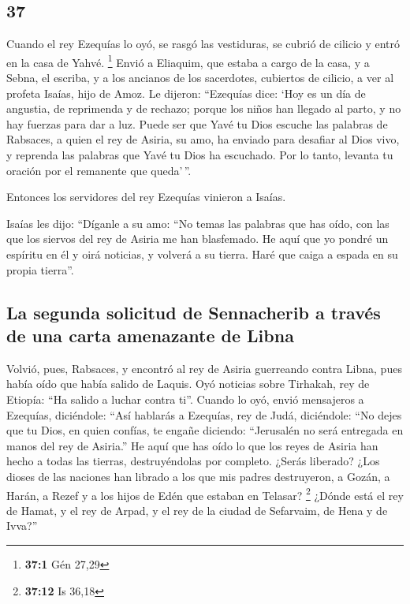 \begin{paracol}{2}
\hypertarget{section-72}{%
\section{37}\label{section-72}}

 Cuando el rey Ezequías lo oyó, se rasgó las vestiduras,
se cubrió de cilicio y entró en la casa de Yahvé. \footnote{\textbf{37:1}
  Gén 27,29}  Envió a Eliaquim, que estaba a cargo de la
casa, y a Sebna, el escriba, y a los ancianos de los sacerdotes,
cubiertos de cilicio, a ver al profeta Isaías, hijo de Amoz.
 Le dijeron: ``Ezequías dice: `Hoy es un día de angustia,
de reprimenda y de rechazo; porque los niños han llegado al parto, y no
hay fuerzas para dar a luz.  Puede ser que Yavé tu Dios
escuche las palabras de Rabsaces, a quien el rey de Asiria, su amo, ha
enviado para desafiar al Dios vivo, y reprenda las palabras que Yavé tu
Dios ha escuchado. Por lo tanto, levanta tu oración por el remanente que
queda'\,''.

 Entonces los servidores del rey Ezequías vinieron a
Isaías.

 Isaías les dijo: ``Díganle a su amo: ``No temas las
palabras que has oído, con las que los siervos del rey de Asiria me han
blasfemado.  He aquí que yo pondré un espíritu en él y
oirá noticias, y volverá a su tierra. Haré que caiga a espada en su
propia tierra''.

\hypertarget{la-segunda-solicitud-de-sennacherib-a-travuxe9s-de-una-carta-amenazante-de-libna}{%
\subsection{La segunda solicitud de Sennacherib a través de una carta
amenazante de
Libna}\label{la-segunda-solicitud-de-sennacherib-a-travuxe9s-de-una-carta-amenazante-de-libna}}

 Volvió, pues, Rabsaces, y encontró al rey de Asiria
guerreando contra Libna, pues había oído que había salido de Laquis.
 Oyó noticias sobre Tirhakah, rey de Etiopía: ``Ha salido
a luchar contra ti''. Cuando lo oyó, envió mensajeros a Ezequías,
diciéndole:  ``Así hablarás a Ezequías, rey de Judá,
diciéndole: ``No dejes que tu Dios, en quien confías, te engañe
diciendo: ``Jerusalén no será entregada en manos del rey de Asiria.''
 He aquí que has oído lo que los reyes de Asiria han
hecho a todas las tierras, destruyéndolas por completo. ¿Serás liberado?
 ¿Los dioses de las naciones han librado a los que mis
padres destruyeron, a Gozán, a Harán, a Rezef y a los hijos de Edén que
estaban en Telasar? \footnote{\textbf{37:12} Is 36,18} 
¿Dónde está el rey de Hamat, y el rey de Arpad, y el rey de la ciudad de
Sefarvaim, de Hena y de Ivva?''


\end{paracol}
